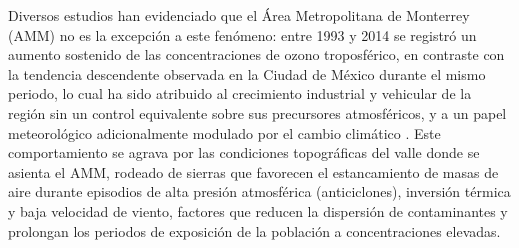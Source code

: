 Diversos estudios han evidenciado que el Área Metropolitana de Monterrey (AMM)
no es la excepción a este fenómeno: entre 1993 y 2014 se registró un aumento
sostenido de las concentraciones de ozono troposférico, en contraste con la
tendencia descendente observada en la Ciudad de México durante el mismo periodo,
lo cual ha sido atribuido al crecimiento industrial y vehicular de la región sin
un control equivalente sobre sus precursores atmosféricos, y a un papel
meteorológico adicionalmente modulado por el cambio climático
\parencite{atmos15070779}. Este comportamiento se agrava por las condiciones
topográficas del valle donde se asienta el AMM, rodeado de sierras que favorecen
el estancamiento de masas de aire durante episodios de alta presión atmosférica
(anticiclones), inversión térmica y baja velocidad de viento, factores que
reducen la dispersión de contaminantes y prolongan los periodos de exposición de
la población a concentraciones elevadas.
